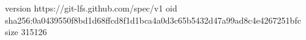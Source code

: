 version https://git-lfs.github.com/spec/v1
oid sha256:0a0439550f8bd1d68ffcd8f1d1bca4a0d3c65b5432d47a99ad8c4e4267251bfc
size 315126
